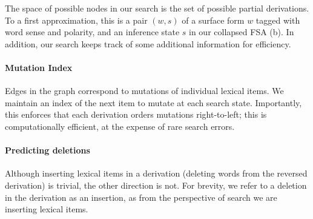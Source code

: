 %
%
The space of possible nodes in our search is the set of possible
  partial derivations.
To a first approximation, this is a pair $(w, s)$ of a surface form
  $w$ tagged with word sense and polarity,
  and an inference state $s$ in our collapsed FSA (b).
In addition, our search keeps
  track of some additional information for efficiency.

%

\paragraph{Mutation Index}
Edges in the graph correspond to mutations of individual lexical items.
We maintain an index of the next item to mutate at each search state.
Importantly, this enforces that each derivation orders mutations
  right-to-left;
  this is computationally efficient, at the expense of rare search
  errors.



\paragraph{Predicting deletions}
Although inserting lexical items in a derivation (deleting words from
  the reversed derivation) is trivial, the other direction is not.
For brevity, we refer to a deletion in the derivation as an insertion,
  as from the perspective of search we are inserting lexical items.

